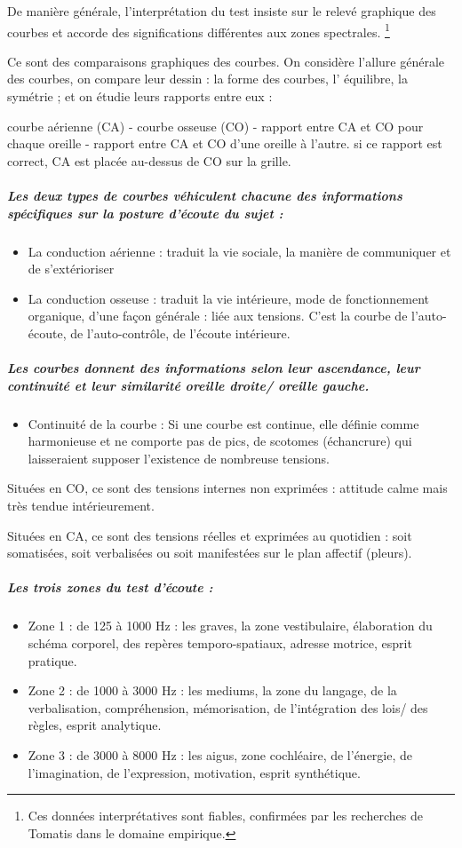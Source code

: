 De manière générale, l'interprétation du test insiste sur le relevé graphique
des
courbes et accorde des
significations différentes aux zones spectrales.
\footnote{ Ces données interprétatives sont fiables, confirmées par
  les recherches de Tomatis dans le domaine
  empirique.}

Ce sont des comparaisons graphiques des courbes. 
On considère l'allure générale des courbes, on compare leur dessin
: la forme des courbes, l' équilibre, la symétrie ; et on étudie leurs
rapports entre eux : 

courbe aérienne (CA) - courbe osseuse (CO) - rapport entre CA et CO
pour chaque oreille - rapport entre CA et CO d\textquoteright une
oreille à l'autre. si ce rapport est correct, CA est placée au-dessus
de CO sur la grille.


\subparagraph{Les deux types de courbes véhiculent chacune des informations spécifiques
sur la posture d'écoute du sujet : }
\begin{itemize}
\item La conduction aérienne : traduit la vie sociale, la manière de communiquer
et de s'extérioriser
\item La conduction osseuse : traduit la vie intérieure, mode de fonctionnement
organique, d'une façon générale : liée aux tensions. C'est la courbe
de l\textquoteright auto-écoute, de l\textquoteright auto-contrôle,
de l'écoute intérieure.
\end{itemize}

\subparagraph{Les courbes donnent des informations selon leur ascendance, leur
continuité et leur similarité oreille droite/ oreille gauche.}
\begin{itemize}
\item Continuité de la courbe : Si une courbe est continue, elle définie
comme harmonieuse et ne comporte pas de pics, de scotomes (échancrure)
qui laisseraient
supposer l'existence de nombreuse tensions.
\end{itemize}
Situées en CO, ce sont des tensions internes non exprimées : attitude
calme mais très tendue intérieurement.

Situées en CA, ce sont des tensions réelles et exprimées au quotidien
: soit somatisées, soit verbalisées ou soit manifestées sur le plan
affectif (pleurs).

\subparagraph{Les trois zones du test d'écoute : }
\begin{itemize}
\item Zone 1 : de 125 à 1000 Hz : les graves, la zone vestibulaire, élaboration
du schéma corporel, des repères temporo-spatiaux, adresse motrice,
esprit pratique.
\item Zone 2 : de 1000 à 3000 Hz : les mediums, la zone du langage, de la
verbalisation, compréhension, mémorisation, de l'intégration des lois/
des règles, esprit analytique.
\item Zone 3 : de 3000 à 8000 Hz : les aigus, zone cochléaire, de l'énergie,
de l'imagination, de l'expression, motivation, esprit synthétique.
\end{itemize}

